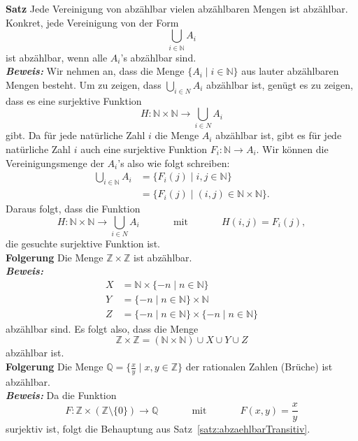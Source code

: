 \textbf{Satz }
Jede Vereinigung von abzählbar vielen abzählbaren Mengen ist abzählbar. Konkret, jede Vereinigung von der Form
\[
	\bigcup_{i\in\mathbb{N}}A_i
\]
ist abzählbar, wenn alle $A_i$'s abzählbar sind. \\
\textbf{\textit{Beweis: }}
Wir nehmen an, dass die Menge $\{A_i\mid i\in \mathbb{N} \}$ aus lauter abzählbaren Mengen besteht. Um zu zeigen, dass $\bigcup_{i\in N}A_i$ abzählbar ist, genügt es zu zeigen, dass es eine surjektive Funktion
\[
	H:\mathbb{N}\times\mathbb{N}\to\bigcup_{i\in N}A_i
\]
gibt. Da für jede natürliche Zahl $i$ die Menge $A_i$ abzählbar ist, gibt es für jede natürliche Zahl $i$ auch eine surjektive Funktion $F_i:\mathbb{N}\to A_i$. Wir können die Vereinigungsmenge der $A_i$'s also wie folgt schreiben:
\begin{align*}
	\bigcup_{i\in \mathbb{N}}A_i & =\{F_i(j)\mid i,j\in\mathbb{N} \}                    \\
	                             & =\{F_i(j)\mid (i,j)\in\mathbb{N}\times\mathbb{N} \}.
\end{align*}
Daraus folgt, dass die Funktion
\[
	H:\mathbb{N}\times\mathbb{N}\to \bigcup_{i\in N}A_i\phantom{abstand}\text{mit}\phantom{abstand} H(i,j)=F_i(j),
\]
die gesuchte surjektive Funktion ist. \\
\textbf{Folgerung }
Die Menge $\mathbb{Z}\times \mathbb{Z}$ ist abzählbar. \\
\textbf{\textit{Beweis: }}
\begin{align*}
	X & =\mathbb{N}\times\{-n\mid n\in \mathbb{N}\}                 \\
	Y & =\{-n\mid n\in \mathbb{N}\}\times\mathbb{N}                 \\
	Z & =\{-n\mid n\in \mathbb{N}\}\times\{-n\mid n\in \mathbb{N}\}
\end{align*}
abzählbar sind. Es folgt also, dass die Menge
\[
	\mathbb{Z}\times\mathbb{Z}=(\mathbb{N}\times\mathbb{N})\cup X\cup Y\cup Z
\]
abzählbar ist. \\
\textbf{Folgerung }
Die Menge $\mathbb{Q}=\big\{\frac{x}{y}\mid x,y\in \mathbb{Z}\big\}$ der rationalen Zahlen (Brüche) ist abzählbar. \\
\textbf{\textit{Beweis: }}
Da die Funktion
\[
	F:\mathbb{Z}\times(\mathbb{Z}\setminus{\{0\}})\to \mathbb{Q}\phantom{abstand}\text{mit}\phantom{abstand}F(x,y)=\frac{x}{y}
\]
surjektiv ist, folgt die Behauptung aus Satz~\ref{satz:abzaehlbarTransitiv}.\\

